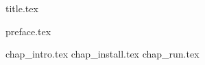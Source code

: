\documentclass[12pt,letterpaper,oneside]{scrbook}
\begin{document}
\frontmatter
{title.tex}
 
\tableofcontents

{preface.tex}

\mainmatter

{chap_intro.tex}
{chap_install.tex}
{chap_run.tex}
\backmatter
\end{document}
